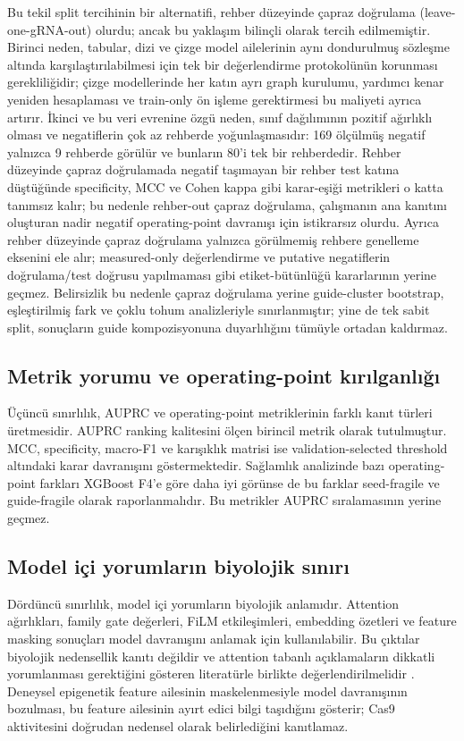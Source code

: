 Bu tekil split tercihinin bir alternatifi, rehber düzeyinde çapraz doğrulama (leave-one-gRNA-out) olurdu; ancak bu yaklaşım bilinçli olarak tercih edilmemiştir. Birinci neden, tabular, dizi ve çizge model ailelerinin aynı dondurulmuş sözleşme altında karşılaştırılabilmesi için tek bir değerlendirme protokolünün korunması gerekliliğidir; çizge modellerinde her katın ayrı graph kurulumu, yardımcı kenar yeniden hesaplaması ve train-only ön işleme gerektirmesi bu maliyeti ayrıca artırır. İkinci ve bu veri evrenine özgü neden, sınıf dağılımının pozitif ağırlıklı olması ve negatiflerin çok az rehberde yoğunlaşmasıdır: 169 ölçülmüş negatif yalnızca 9 rehberde görülür ve bunların 80'i tek bir rehberdedir. Rehber düzeyinde çapraz doğrulamada negatif taşımayan bir rehber test katına düştüğünde specificity, MCC ve Cohen kappa gibi karar-eşiği metrikleri o katta tanımsız kalır; bu nedenle rehber-out çapraz doğrulama, çalışmanın ana kanıtını oluşturan nadir negatif operating-point davranışı için istikrarsız olurdu. Ayrıca rehber düzeyinde çapraz doğrulama yalnızca görülmemiş rehbere genelleme eksenini ele alır; measured-only değerlendirme ve putative negatiflerin doğrulama/test doğrusu yapılmaması gibi etiket-bütünlüğü kararlarının yerine geçmez. Belirsizlik bu nedenle çapraz doğrulama yerine guide-cluster bootstrap, eşleştirilmiş fark ve çoklu tohum analizleriyle sınırlanmıştır; yine de tek sabit split, sonuçların guide kompozisyonuna duyarlılığını tümüyle ortadan kaldırmaz.

\subsection{Metrik yorumu ve operating-point kırılganlığı}

Üçüncü sınırlılık, AUPRC ve operating-point metriklerinin farklı kanıt türleri üretmesidir. AUPRC ranking kalitesini ölçen birincil metrik olarak tutulmuştur. MCC, specificity, macro-F1 ve karışıklık matrisi ise validation-selected threshold altındaki karar davranışını göstermektedir. Sağlamlık analizinde bazı operating-point farkları XGBoost F4'e göre daha iyi görünse de bu farklar seed-fragile ve guide-fragile olarak raporlanmalıdır. Bu metrikler AUPRC sıralamasının yerine geçmez.

\subsection{Model içi yorumların biyolojik sınırı}

Dördüncü sınırlılık, model içi yorumların biyolojik anlamıdır. Attention ağırlıkları, family gate değerleri, FiLM etkileşimleri, embedding özetleri ve feature masking sonuçları model davranışını anlamak için kullanılabilir. Bu çıktılar biyolojik nedensellik kanıtı değildir ve attention tabanlı açıklamaların dikkatli yorumlanması gerektiğini gösteren literatürle birlikte değerlendirilmelidir . Deneysel epigenetik feature ailesinin maskelenmesiyle model davranışının bozulması, bu feature ailesinin ayırt edici bilgi taşıdığını gösterir; Cas9 aktivitesini doğrudan nedensel olarak belirlediğini kanıtlamaz.

